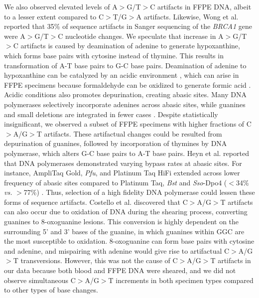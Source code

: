 We also observed elevated levels of A$>$G/T$>$C artifacts in FFPE DNA, albeit to a lesser extent compared to C$>$T/G$>$A artifacts. Likewise, Wong et al. \cite{Wong1998} reported that 35\% of sequence artifacts in Sanger sequencing of the \textit{BRCA1} gene were A$>$G/T$>$C nucleotide changes. We speculate that increase in A$>$G/T$>$C artifacts is caused by deamination of adenine to generate hypoxanthine, which forms base pairs with cytosine instead of thymine. This results in transformation of A-T base pairs to G-C base pairs. Deamination of adenine to hypoxanthine can be catalyzed by an acidic environment \cite{Wang2010}, which can arise in FFPE specimens because formaldehyde can be oxidized to generate formic acid \cite{Do2015a}. Acidic conditions also promotes depurination, creating abasic sites. Many DNA polymerases selectively incorporate adenines across abasic sites, while guanines and small deletions are integrated in fewer cases \cite{Heyn2010}. Despite statistically insignificant, we observed a subset of FFPE specimens with higher fractions of C$>$A/G$>$T artifacts. These artifactual changes could be resulted from depurination of guanines, followed by incorporation of thymines by DNA polymerase, which alters G-C base pairs to A-T base pairs. Heyn et al. \cite{Heyn2010} reported that DNA polymerases demonstrated varying bypass rates at abasic sites. For instance, AmpliTaq Gold, \textit{Pfu}, and Platinum Taq HiFi extended across lower frequency of abasic sites compared to Platinum Taq, \textit{Bst} and \textit{Sso}-Dpo4 ($<$34\% \textit{vs.} $>$77\%) \cite{Heyn2010}. Thus, selection of a high fidelity DNA polymerase could lessen these forms of sequence artifacts. Costello et al. \cite{Costello2013} discovered that C$>$A/G$>$T artifacts can also occur due to oxidation of DNA during the shearing process, converting guanines to 8-oxoguanine lesions. This conversion is highly dependent on the surrounding 5' and 3' bases of the guanine, in which guanines within GGC are the most susceptible to oxidation. 8-oxoguanine can form base pairs with cytosine and adenine, and mispairing with adenine would give rise to artifactual C$>$A/G$>$T transversions. However, this was not the cause of C$>$A/G$>$T artifacts in our data because both blood and FFPE DNA were sheared, and we did not observe simultaneous C$>$A/G$>$T increments in both specimen types compared to other types of base changes.

